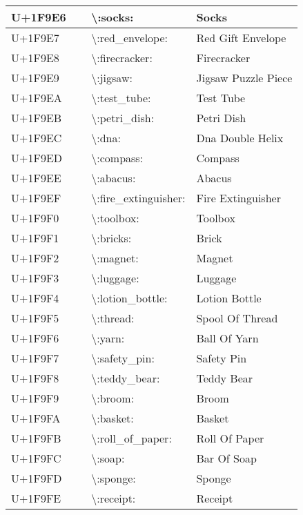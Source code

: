 \begin{table}[h]
\begin{tabulary}{\linewidth}{|L|L|L|L|}
\hline
U+1F9E6 & 🧦 & {\textbackslash}:socks: & Socks \\
\hline
U+1F9E7 & 🧧 & {\textbackslash}:red\_envelope: & Red Gift Envelope \\
\hline
U+1F9E8 & 🧨 & {\textbackslash}:firecracker: & Firecracker \\
\hline
U+1F9E9 & 🧩 & {\textbackslash}:jigsaw: & Jigsaw Puzzle Piece \\
\hline
U+1F9EA & 🧪 & {\textbackslash}:test\_tube: & Test Tube \\
\hline
U+1F9EB & 🧫 & {\textbackslash}:petri\_dish: & Petri Dish \\
\hline
U+1F9EC & 🧬 & {\textbackslash}:dna: & Dna Double Helix \\
\hline
U+1F9ED & 🧭 & {\textbackslash}:compass: & Compass \\
\hline
U+1F9EE & 🧮 & {\textbackslash}:abacus: & Abacus \\
\hline
U+1F9EF & 🧯 & {\textbackslash}:fire\_extinguisher: & Fire Extinguisher \\
\hline
U+1F9F0 & 🧰 & {\textbackslash}:toolbox: & Toolbox \\
\hline
U+1F9F1 & 🧱 & {\textbackslash}:bricks: & Brick \\
\hline
U+1F9F2 & 🧲 & {\textbackslash}:magnet: & Magnet \\
\hline
U+1F9F3 & 🧳 & {\textbackslash}:luggage: & Luggage \\
\hline
U+1F9F4 & 🧴 & {\textbackslash}:lotion\_bottle: & Lotion Bottle \\
\hline
U+1F9F5 & 🧵 & {\textbackslash}:thread: & Spool Of Thread \\
\hline
U+1F9F6 & 🧶 & {\textbackslash}:yarn: & Ball Of Yarn \\
\hline
U+1F9F7 & 🧷 & {\textbackslash}:safety\_pin: & Safety Pin \\
\hline
U+1F9F8 & 🧸 & {\textbackslash}:teddy\_bear: & Teddy Bear \\
\hline
U+1F9F9 & 🧹 & {\textbackslash}:broom: & Broom \\
\hline
U+1F9FA & 🧺 & {\textbackslash}:basket: & Basket \\
\hline
U+1F9FB & 🧻 & {\textbackslash}:roll\_of\_paper: & Roll Of Paper \\
\hline
U+1F9FC & 🧼 & {\textbackslash}:soap: & Bar Of Soap \\
\hline
U+1F9FD & 🧽 & {\textbackslash}:sponge: & Sponge \\
\hline
U+1F9FE & 🧾 & {\textbackslash}:receipt: & Receipt \\

\end{tabulary}
\end{table}

